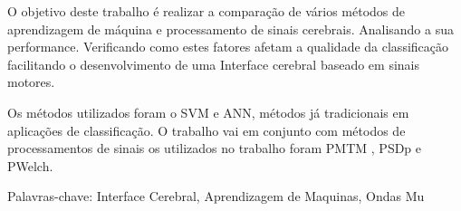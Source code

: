 \setlength{\absparsep}{18pt} 
\begin{resumo}
	
	O objetivo deste trabalho é  realizar a comparação de vários métodos de aprendizagem de máquina e processamento de sinais cerebrais. Analisando a sua performance. Verificando como estes fatores afetam a qualidade da classificação facilitando o desenvolvimento de uma Interface cerebral baseado em sinais motores.
	\par Os métodos utilizados foram o \ac{SVM} e \ac{ANN}, métodos j\'a tradicionais em aplicações de classificação. O trabalho vai em conjunto com métodos de processamentos de sinais os utilizados no trabalho foram \ac{PMTM} , \ac{PSDp} e \ac{PWelch}.
	
	Palavras-chave:  Interface Cerebral, Aprendizagem de Maquinas, Ondas Mu %
	
\end{resumo}